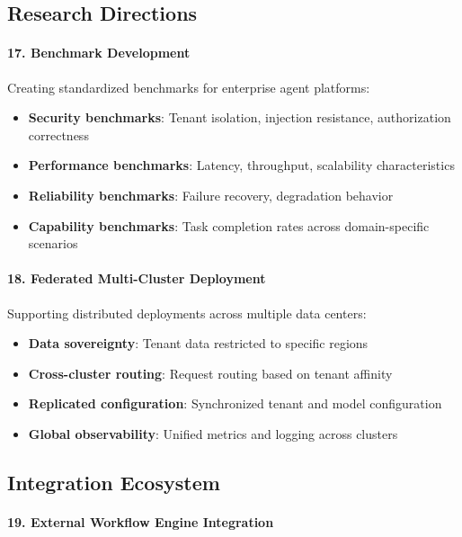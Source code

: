 \subsection{Research Directions}

\paragraph{17. Benchmark Development}

Creating standardized benchmarks for enterprise agent platforms:

\begin{itemize}
    \item \textbf{Security benchmarks}: Tenant isolation, injection resistance, authorization correctness
    \item \textbf{Performance benchmarks}: Latency, throughput, scalability characteristics
    \item \textbf{Reliability benchmarks}: Failure recovery, degradation behavior
    \item \textbf{Capability benchmarks}: Task completion rates across domain-specific scenarios
\end{itemize}

\paragraph{18. Federated Multi-Cluster Deployment}

Supporting distributed deployments across multiple data centers:

\begin{itemize}
    \item \textbf{Data sovereignty}: Tenant data restricted to specific regions
    \item \textbf{Cross-cluster routing}: Request routing based on tenant affinity
    \item \textbf{Replicated configuration}: Synchronized tenant and model configuration
    \item \textbf{Global observability}: Unified metrics and logging across clusters
\end{itemize}

\subsection{Integration Ecosystem}

\paragraph{19. External Workflow Engine Integration}

